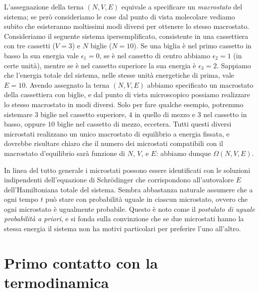 L'assegnazione della terna $(N,V,E)$ equivale a specificare un {\em macrostato} del sistema; se però consideriamo le cose dal punto di vista molecolare vediamo subito che esisteranno moltissimi modi diversi per ottenere lo stesso macrostato. Consideriamo il seguente sistema ipersemplificato, consistente in una cassettiera con tre cassetti ($V=3$) e $N$ biglie ($N = 10$). Se una biglia è nel primo cassetto in basso la sua energia vale $\epsilon_{1} = 0$, se è nel cassetto di centro abbiamo $\epsilon_{2} = 1$ (in certe unità), mentre se è nel cassetto superiore la sua energia è $\epsilon_{3} = 2$. Sappiamo che l'energia totale del sistema, nelle stesse unità energetiche di prima, vale $E = 10$. Avendo assegnato la terna $(N,V,E)$ abbiamo specificato un macrostato della cassettiera con biglie, e dal punto di vista microscopico possiamo realizzare lo stesso macrostato in modi diversi. Solo per fare qualche esempio, potremmo sistemare $3$ biglie nel cassetto superiore, $4$ in quello di mezzo e $3$ nel cassetto in basso, oppure $10$ biglie nel cassetto di mezzo, eccetera. Tutti questi diversi microstati realizzano un unico macrostato di equilibrio a energia fissata, e dovrebbe risultare chiaro che il numero dei microstati compatibili con il macrostato d'equilibrio sarà funzione di $N$, $V$, e $E$: abbiamo dunque $\Omega(N,V,E)$.

In linea del tutto generale i microstati possono essere identificati con le soluzioni indipendenti dell'equazione di Schr\"odinger che corrispondono all'autovalore $E$ dell'Hamiltoniana totale del sistema. Sembra abbastanza naturale assumere che a ogni tempo $t$ può stare con probabilità uguale in ciascun microstato, ovvero che ogni microstato è ugualmente probabile. Questo è noto come il {\em postulato di uguale probabilità a priori}, e si fonda sulla convinzione che se due microstati hanno la stessa energia il sistema non ha motivi particolari per preferire l'uno all'altro. 

%
\section{Primo contatto con la termodinamica}
\label{sec:primo}

